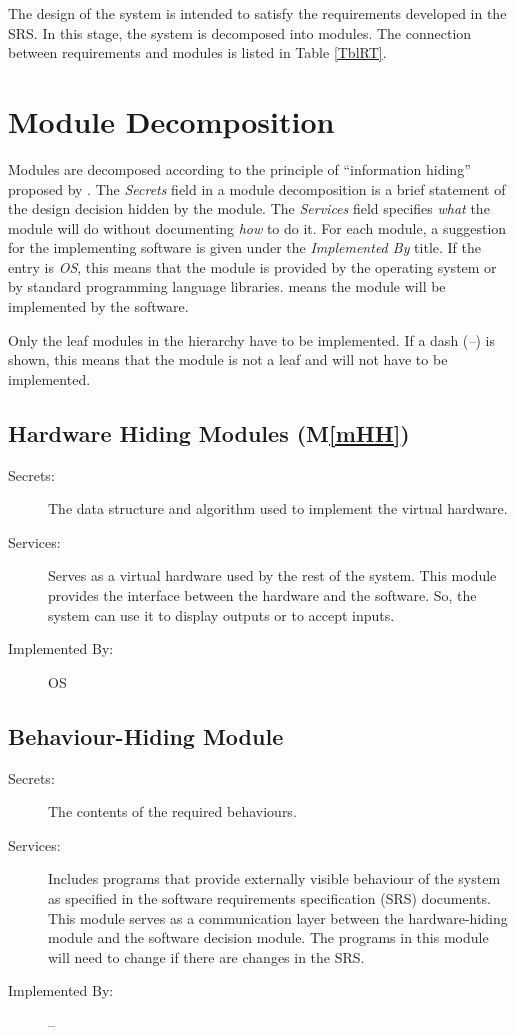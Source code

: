 \documentclass[12pt, titlepage]{article}
\newcommand{\mref}[1]{M\ref{#1}}
\begin{document}
The design of the system is intended to satisfy the requirements developed in
the SRS. In this stage, the system is decomposed into modules. The connection
between requirements and modules is listed in Table \ref{TblRT}.

\section{Module Decomposition} \label{SecMD}

Modules are decomposed according to the principle of ``information hiding''
proposed by \citet{ParnasEtAl1984}. The \emph{Secrets} field in a module
decomposition is a brief statement of the design decision hidden by the
module. The \emph{Services} field specifies \emph{what} the module will do
without documenting \emph{how} to do it. For each module, a suggestion for the
implementing software is given under the \emph{Implemented By} title. If the
entry is \emph{OS}, this means that the module is provided by the operating
system or by standard programming language libraries.  \emph{\progname{}} means the
module will be implemented by the \progname{} software.

Only the leaf modules in the hierarchy have to be implemented. If a dash
(\emph{--}) is shown, this means that the module is not a leaf and will not have
to be implemented.

\subsection{Hardware Hiding Modules (\mref{mHH})}

\begin{description}
\item[Secrets:]The data structure and algorithm used to implement the virtual
  hardware.
\item[Services:]Serves as a virtual hardware used by the rest of the
  system. This module provides the interface between the hardware and the
  software. So, the system can use it to display outputs or to accept inputs.
\item[Implemented By:] OS
\end{description}

\subsection{Behaviour-Hiding Module}

\begin{description}
\item[Secrets:]The contents of the required behaviours.
\item[Services:]Includes programs that provide externally visible behaviour of
  the system as specified in the software requirements specification (SRS)
  documents. This module serves as a communication layer between the
  hardware-hiding module and the software decision module. The programs in this
  module will need to change if there are changes in the SRS.
\item[Implemented By:] --
\end{description}
\end{document}
